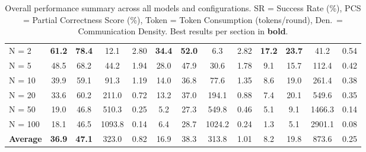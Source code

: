 \begin{table}[t]
\begin{tabular}{l cc cc cc cc cc cc}
\quad N = 2  & \textbf{61.2} & \textbf{78.4} & 12.1  & 2.80 
             & \textbf{34.4} & \textbf{52.0} & 6.3   & 2.82 
             & \textbf{17.2} & \textbf{23.7} & 41.2  & 0.54 \\
\quad N = 5  & 48.5 & 68.2 & 44.2  & 1.94 
             & 28.0 & 47.9 & 30.6  & 1.78 
             & 9.1  & 15.7 & 112.4 & 0.42 \\
\quad N = 10 & 39.9 & 59.1 & 91.3  & 1.19 
             & 14.0 & 36.8 & 77.6  & 1.35 
             & 8.6  & 19.0 & 261.4 & 0.38 \\
\quad N = 20 & 33.6 & 60.2 & 211.0 & 0.72 
             & 13.2 & 37.0 & 194.1 & 0.88 
             & 7.4  & 20.1 & 549.6 & 0.35 \\
\quad N = 50 & 19.0 & 46.8 & 510.3 & 0.25 
             & 5.2  & 27.3 & 549.8 & 0.46 
             & 5.1  & 9.1  & 1466.3& 0.14 \\
\quad N = 100& 18.1 & 46.5 & 1093.8& 0.14 
             & 6.4  & 28.7 & 1024.2& 0.24 
             & 1.3  & 5.1  & 2901.1& 0.08 \\
\midrule
\textbf{Average} & \textbf{36.9} & \textbf{47.1} & 323.0 & 0.82 
                 & 16.9 & 38.3 & 313.8 & 1.01 
                 & 8.2  & 19.8 & 873.6 & 0.25 \\
\bottomrule
\end{tabular}
\caption{Overall performance summary across all models and configurations. SR = Success Rate (\%), PCS = Partial Correctness Score (\%), Token = Token Consumption (tokens/round), Den.\ = Communication Density. Best results per section in \textbf{bold}.}
\label{tab:overall_results}
\end{table}



